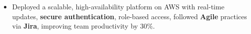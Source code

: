 \documentclass[10pt]{extarticle}
\begin{document}
\begin{itemize}
\begin{itemize}
        \item Deployed a scalable, high-availability platform on AWS with real-time updates, \textbf{secure authentication}, role-based access, followed \textbf{Agile} practices via \textbf{Jira}, improving team productivity by 30\%.
    \end{itemize}


\end{itemize}
\end{document}
